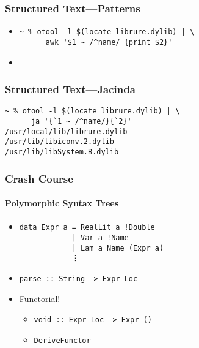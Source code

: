 \documentclass{beamer}
\begin{document}

\begin{frame}[fragile]
  \frametitle{Structured Text---Patterns}
  \begin{itemize}
    \item
      \begin{verbatim}
~ % otool -l $(locate librure.dylib) | \
      awk '$1 ~ /^name/ {print $2}'
      \end{verbatim}
    \item {}
  \end{itemize}
\end{frame}

\begin{frame}[fragile]
  \frametitle{Structured Text---Jacinda}
  \begin{verbatim}
~ % otool -l $(locate librure.dylib) | \
      ja '{`1 ~ /^name/}{`2}'
/usr/local/lib/librure.dylib
/usr/lib/libiconv.2.dylib
/usr/lib/libSystem.B.dylib
  \end{verbatim}
\end{frame}


\begin{frame}[fragile]
  \frametitle{Crash Course}
  \framesubtitle{Polymorphic Syntax Trees}
    \begin{itemize}
      \item
      \begin{verbatim}
data Expr a = RealLit a !Double
            | Var a !Name
            | Lam a Name (Expr a)
            ⋮
\end{verbatim}
      \item \verb|parse :: String -> Expr Loc|
      \item Functorial!
        \begin{itemize}
          \item \verb|void :: Expr Loc -> Expr ()|
          \item \verb|DeriveFunctor|
        \end{itemize}
    \end{itemize}
\end{frame}
\end{document}
